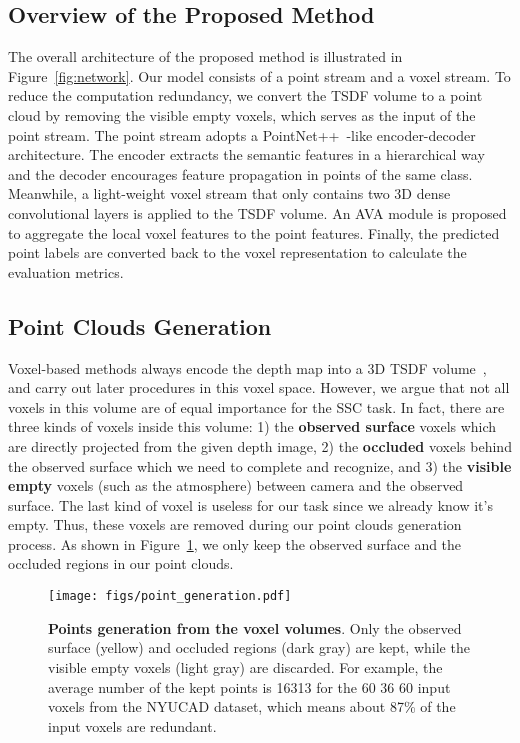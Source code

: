 \subsection{Overview of the Proposed Method}



The overall architecture of the proposed method is illustrated in Figure~\ref{fig:network}. 
Our model consists of a point stream and a voxel stream.
To reduce the computation redundancy, we convert the TSDF volume to a point cloud by removing the visible empty voxels, which serves as the input of the point stream. 
The point stream adopts a PointNet++~\cite{qi2017pointnet++}-like encoder-decoder architecture.
The encoder extracts the semantic features in a hierarchical way and the decoder encourages feature propagation in points of the same class. 
Meanwhile, a light-weight voxel stream that only contains two 3D dense convolutional layers is applied to the TSDF volume.
An AVA module is proposed to aggregate the local voxel features to the point features. 
Finally, the predicted point labels are converted back to the voxel representation to calculate the evaluation metrics. 

\subsection{Point Clouds Generation}
\label{sec:point-encoding}
Voxel-based methods always encode the depth map into a 3D TSDF volume~\cite{song2017semantic-sscnet}, and carry out later procedures in this voxel space. 
However, we argue that not all voxels in this volume are of equal importance for the SSC task.
In fact, there are three kinds of voxels inside this volume:
1) the \textbf{observed surface} voxels which are directly projected from the given depth image,
2) the \textbf{occluded} voxels behind the observed surface which we need to complete and recognize,
and 3) the \textbf{visible empty} voxels (such as the atmosphere) between camera and the observed surface. 
The last kind of voxel is useless for our task since we already know it's empty. 
Thus, these voxels are removed during our point clouds generation process.
As shown in Figure~\ref{fig:Point_gen}, we only keep the observed surface and the occluded regions in our point clouds.

\begin{figure}[htbp]
  \centering
  \texttt{[image: figs/point\_generation.pdf]}
  \caption{
 \textbf{Points generation from the voxel volumes}. 
 Only the observed surface (yellow) and occluded regions (dark gray) are kept, while the visible empty voxels (light gray) are discarded.
 For example, the average number of the kept points is 16313 for the 60  36  60 input voxels from the NYUCAD dataset, which means about 87\% of the input voxels are redundant.
 }
  \label{fig:Point_gen}
\end{figure}


